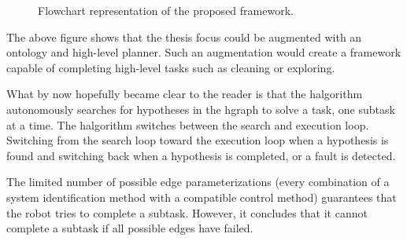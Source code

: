 \begin{figure}[H]
\caption{Flowchart representation of the proposed framework.}%
\label{tikz:flowchart_proposed_method}
\end{figure}

The above figure shows that the thesis focus could be augmented with an ontology and high-level planner. Such an augmentation would create a framework capable of completing high-level tasks such as cleaning or exploring.\bs





What by now hopefully became clear to the reader is that the \ac{halgorithm} autonomously searches for hypotheses in the \ac{hgraph} to solve a task, one subtask at a time. The \ac{halgorithm} switches between the search and execution loop. Switching from the search loop toward the execution loop when a hypothesis is found and switching back when a hypothesis is completed, or a fault is detected.\bs

The limited number of possible edge parameterizations (every combination of a system identification method with a compatible control method) guarantees that the robot tries to complete a subtask. However, it concludes that it cannot complete a subtask if all possible edges have failed.\bs

